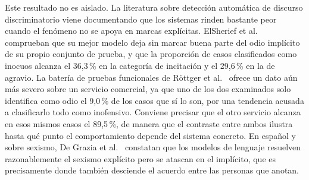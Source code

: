 \begin{table}[H]
    \centering
    \begingroup
    \small
    \renewcommand{\texttt}[1]{{\ttfamily #1}}
    \endgroup
\end{table}

Este resultado no es aislado. La literatura sobre detección automática de discurso
discriminatorio viene documentando que los sistemas rinden bastante peor cuando el
fenómeno no se apoya en marcas explícitas. ElSherief et al.~\cite{elsherief2021}
comprueban que su mejor modelo deja sin marcar buena parte del odio implícito de su
propio conjunto de prueba, y que la proporción de casos clasificados como inocuos
alcanza el 36,3\,\% en la categoría de incitación y el 29,6\,\% en la de agravio.
La batería de pruebas funcionales de Röttger et al.~\cite{rottger2021} ofrece un dato
aún más severo sobre un servicio comercial, ya que uno de los dos examinados solo
identifica como odio el 9,0\,\% de los casos que sí lo son, por una tendencia acusada
a clasificarlo todo como inofensivo. Conviene precisar que el otro servicio alcanza
en esos mismos casos el 89,5\,\%, de manera que el contraste entre ambos ilustra hasta
qué punto el comportamiento depende del sistema concreto. En español y sobre sexismo,
De Grazia et al.~\cite{degrazia2025} constatan que los modelos de lenguaje resuelven
razonablemente el sexismo explícito pero se atascan en el implícito, que es
precisamente donde también desciende el acuerdo entre las personas que anotan.

